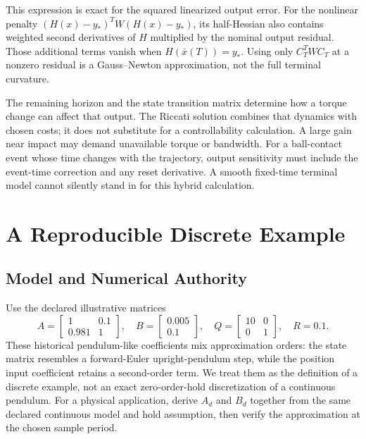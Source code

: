 This expression is exact for the squared linearized output error. For the nonlinear penalty $(H(x)-y_*)^TW(H(x)-y_*)$, its half-Hessian also contains weighted second derivatives of $H$ multiplied by the nominal output residual. Those additional terms vanish when $H(\bar x(T))=y_*$. Using only $C_T^TWC_T$ at a nonzero residual is a Gauss--Newton approximation, not the full terminal curvature.

The remaining horizon and the state transition matrix determine how a torque change can affect that output. The Riccati solution combines that dynamics with chosen costs; it does not substitute for a controllability calculation. A large gain near impact may demand unavailable torque or bandwidth. For a ball-contact event whose time changes with the trajectory, output sensitivity must include the event-time correction and any reset derivative. A smooth fixed-time terminal model cannot silently stand in for this hybrid calculation.

\section{A Reproducible Discrete Example}

\subsection{Model and Numerical Authority}

Use the declared illustrative matrices
\begin{equation}
A=\begin{bmatrix}1&0.1\\0.981&1\end{bmatrix},\quad
B=\begin{bmatrix}0.005\\0.1\end{bmatrix},\quad
Q=\begin{bmatrix}10&0\\0&1\end{bmatrix},\quad R=0.1.
\end{equation}
These historical pendulum-like coefficients mix approximation orders: the state matrix resembles a forward-Euler upright-pendulum step, while the position input coefficient retains a second-order term. We treat them as the definition of a discrete example, not an exact zero-order-hold discretization of a continuous pendulum. For a physical application, derive $A_d$ and $B_d$ together from the same declared continuous model and hold assumption, then verify the approximation at the chosen sample period.

